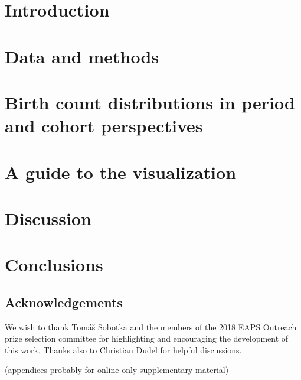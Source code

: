 \documentclass{article}
\begin{document}
\pagebreak
\section{Introduction}
\label{sec:intro}


\section{Data and methods}
\label{sec:data}


\section{Birth count distributions in period and cohort perspectives}
\label{sec:birthdist}


\section{A guide to the visualization}
\label{sec:description}


\section{Discussion}
\label{sec:disc}


\section{Conclusions}
\label{sec:conc}


\subsection*{Acknowledgements} We wish to thank Tom\'a\v{s} Sobotka and the members of the 2018 EAPS Outreach prize selection committee for highlighting and encouraging the development of this work. Thanks also to Christian Dudel for helpful discussions.

\FloatBarrier

\pagebreak
\begin{appendix}
(appendices probably for online-only supplementary material)

\end{appendix}
\pagebreak

\theendnotes
\pagebreak

\listoftables
\pagebreak

\listoffigures
\pagebreak

   
\end{document}
